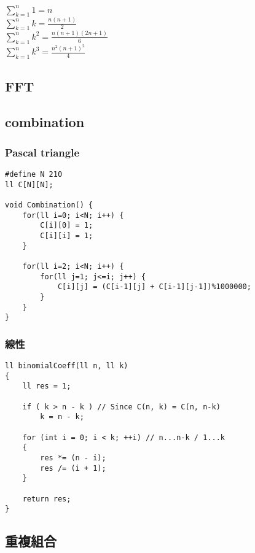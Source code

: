 \documentclass[10pt,oneside]{article}
\begin{document}
\begin{landscape}
\begin{multicols}{2}
$\sum_{k=1}^{n} 1= n$\\
$\sum_{k=1}^{n} k= \frac{n(n+1)}{2}$\\
$\sum_{k=1}^{n} k^2= \frac{n(n+1)(2n+1)}{6}$\\
$\sum_{k=1}^{n} k^3= \frac{n^2(n+1)^2}{4}$\\

\subsection{FFT}

\subsection{combination}

\subsubsection{Pascal triangle}

\begin{lstlisting}
#define N 210
ll C[N][N];

void Combination() {
    for(ll i=0; i<N; i++) {
        C[i][0] = 1;
        C[i][i] = 1;
    }

    for(ll i=2; i<N; i++) {
        for(ll j=1; j<=i; j++) {
            C[i][j] = (C[i-1][j] + C[i-1][j-1])%1000000;
        }
    }
}
\end{lstlisting}

\subsubsection{線性}

\begin{lstlisting}
ll binomialCoeff(ll n, ll k)
{
    ll res = 1;
 
    if ( k > n - k ) // Since C(n, k) = C(n, n-k)
        k = n - k;
 
    for (int i = 0; i < k; ++i) // n...n-k / 1...k
    {
        res *= (n - i);
        res /= (i + 1);
    }
 
    return res;
}
\end{lstlisting}

\subsection{重複組合}



\end{multicols}
\end{landscape}
\end{document}

